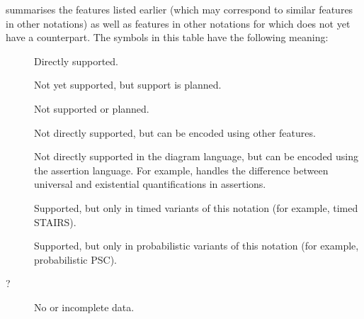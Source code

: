  summarises the \langname{} features listed earlier
(which may correspond to similar features in other
notations) as well as features in other notations for which \langname{} does not yet have a counterpart.
The symbols in this table have the following meaning:

\begin{description}
  \item[\OK] Directly supported.
  \item[\SOON] Not yet supported, but
  support is planned.
  \item[\NO] Not supported or planned.
  \item[\ISH] Not directly supported, but can be encoded using other
  features.
  \item[\ASST] Not directly supported in the
  diagram language, but can be encoded using the
  assertion language.  For example, \langname{} handles
  the difference between universal and existential
  quantifications in assertions.
  \item[\INTIMED] Supported, but only in timed variants of this
  notation (for example, timed STAIRS).
  \item[\INPROB] Supported, but only in
  probabilistic variants of this
  notation (for example, probabilistic PSC). 
  \item[?] No or incomplete data.
\end{description}

